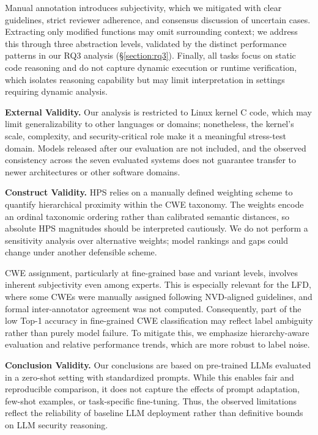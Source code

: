 \documentclass[lettersize,journal]{IEEEtran}
\begin{document}
Manual annotation introduces subjectivity, which we mitigated with clear guidelines, strict reviewer adherence, and consensus discussion of uncertain cases. Extracting only modified functions may omit surrounding context; we address this through three abstraction levels, validated by the distinct performance patterns in our RQ3 analysis (\S\ref{section:rq3}). Finally, all tasks focus on static code reasoning and do not capture dynamic execution or runtime verification, which isolates reasoning capability but may limit interpretation in settings requiring dynamic analysis.

\textbf{External Validity.}
Our analysis is restricted to Linux kernel C code, which may limit generalizability to other languages or domains; nonetheless, the kernel's scale, complexity, and security-critical role make it a meaningful stress-test domain. Models released after our evaluation are not included, and the observed consistency across the seven evaluated systems does not guarantee transfer to newer architectures or other software domains.


\textbf{Construct Validity.}
HPS relies on a manually defined weighting scheme to quantify hierarchical proximity within the CWE taxonomy. The weights encode an ordinal taxonomic ordering rather than calibrated semantic distances, so absolute HPS magnitudes should be interpreted cautiously. We do not perform a sensitivity analysis over alternative weights; model rankings and gaps could change under another defensible scheme.

CWE assignment, particularly at fine-grained base and variant levels, involves inherent subjectivity even among experts. This is especially relevant for the LFD, where some CWEs were manually assigned following NVD-aligned guidelines, and formal inter-annotator agreement was not computed. Consequently, part of the low Top-1 accuracy in fine-grained CWE classification may reflect label ambiguity rather than purely model failure. To mitigate this, we emphasize hierarchy-aware evaluation and relative performance trends, which are more robust to label noise.

\textbf{Conclusion Validity.}
Our conclusions are based on pre-trained LLMs evaluated in a zero-shot setting with standardized prompts. While this enables fair and reproducible comparison, it does not capture the effects of prompt adaptation, few-shot examples, or task-specific fine-tuning. Thus, the observed limitations reflect the reliability of baseline LLM deployment rather than definitive bounds on LLM security reasoning.
\end{document}
